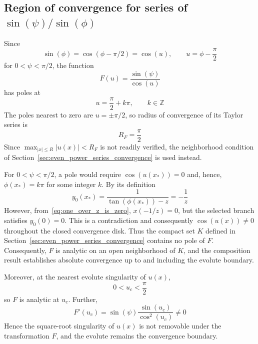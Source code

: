 \documentclass[a4paper]{amsart}
\begin{document}
\subsection{Region of convergence for series of \texorpdfstring{$\sin(\psi)/\sin(\phi)$}{sin(ψ)/sin(φ)}}
Since
\begin{equation*}
\sin(\phi)=\cos(\phi-\pi/2)=\cos(u),
\qquad
u=\phi-\frac{\pi}{2}
\end{equation*}
for $0<\psi<\pi/2$, the function
\begin{equation*}
F(u)=\frac{\sin(\psi)}{\cos(u)}
\end{equation*}
has poles at
\begin{equation*}
u=\frac{\pi}{2} + k\pi,\qquad k\in\mathbb{Z}
\end{equation*}
The poles nearest to zero are $u=\pm\pi/2$, so radius of convergence of its Taylor series is
\begin{equation*}
R_F=\frac{\pi}{2}
\end{equation*}
Since $\max_{|x|\leq R}|u(x)|<R_F$ is not readily verified, the neighborhood condition of Section~\ref{sec:even_power_series_convergence} is used instead.

For $0<\psi<\pi/2$, a pole would require $\cos(u(x_\ast))=0$ and, hence, $\phi(x_\ast)=k\pi$ for some integer $k$. By its definition
\begin{equation*}
y_0(x_\ast)=\frac{1}{\tan(\phi(x_\ast))-z}=-\frac{1}{z}
\end{equation*}
However, from~\eqref{eq:one_over_z_is_zero}, $x(-1/z)=0$, but the selected branch satisfies $y_0(0)=0$. This is a contradiction and consequently $\cos(u(x))\neq0$ throughout the closed convergence disk.
%
Thus the compact set $K$ defined in Section~\ref{sec:even_power_series_convergence} contains no pole of $F$. Consequently, $F$ is analytic on an open neighborhood of $K$, and the composition result establishes absolute convergence up to and including the evolute boundary.

Moreover, at the nearest evolute singularity of $u(x)$,
\begin{equation*}
0<u_c<\frac{\pi}{2}
\end{equation*}
so $F$ is analytic at $u_c$. Further,
\begin{equation*}
F'(u_c)
=
\sin(\psi)\frac{\sin(u_c)}{\cos^2(u_c)}\neq0
\end{equation*}
Hence the square-root singularity of $u(x)$ is not removable under the transformation $F$, and the evolute remains the convergence boundary. %
\end{document}
